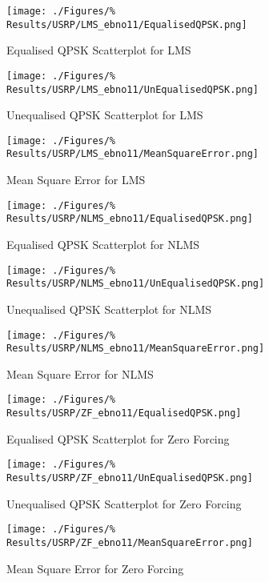 \begin{figure}[ht]
	\centering
	\begin{minipage}{0.49\textwidth}
		\centering
		\texttt{[image: ./Figures/\%
		Results/USRP/LMS\_ebno11/EqualisedQPSK.png]}
		\captionsetup{width=0.75\linewidth}
		\caption{Equalised QPSK Scatterplot for LMS}
	\end{minipage}
	\begin{minipage}{0.49\textwidth}
		\centering
		\texttt{[image: ./Figures/\%
		Results/USRP/LMS\_ebno11/UnEqualisedQPSK.png]}
		\captionsetup{width=0.75\linewidth}
		\caption{Unequalised QPSK Scatterplot for LMS}
	\end{minipage}
\end{figure}
\begin{figure}[ht]
	\centering
	\texttt{[image: ./Figures/\%
	Results/USRP/LMS\_ebno11/MeanSquareError.png]}
	\captionsetup{width=0.75\linewidth}
	\caption{Mean Square Error for LMS}
\end{figure}

\begin{figure}[ht]
	\centering
	\begin{minipage}{0.49\textwidth}
		\centering
		\texttt{[image: ./Figures/\%
		Results/USRP/NLMS\_ebno11/EqualisedQPSK.png]}
		\captionsetup{width=0.75\linewidth}
		\caption{Equalised QPSK Scatterplot for NLMS}
	\end{minipage}
	\begin{minipage}{0.49\textwidth}
		\centering
		\texttt{[image: ./Figures/\%
		Results/USRP/NLMS\_ebno11/UnEqualisedQPSK.png]}
		\captionsetup{width=0.75\linewidth}
		\caption{Unequalised QPSK Scatterplot for NLMS}
	\end{minipage}
\end{figure}
\begin{figure}[ht]
	\centering
	\texttt{[image: ./Figures/\%
	Results/USRP/NLMS\_ebno11/MeanSquareError.png]}
	\captionsetup{width=0.75\linewidth}
	\caption{Mean Square Error for NLMS}
\end{figure}

\begin{figure}[ht]
	\centering
	\begin{minipage}{0.49\textwidth}
		\centering
		\texttt{[image: ./Figures/\%
		Results/USRP/ZF\_ebno11/EqualisedQPSK.png]}
		\captionsetup{width=0.75\linewidth}
		\caption{Equalised QPSK Scatterplot for Zero 
		Forcing}
	\end{minipage}
	\begin{minipage}{0.49\textwidth}
		\centering
		\texttt{[image: ./Figures/\%
		Results/USRP/ZF\_ebno11/UnEqualisedQPSK.png]}
		\captionsetup{width=0.75\linewidth}
		\caption{Unequalised QPSK Scatterplot for Zero 
		Forcing}
	\end{minipage}
\end{figure}
\begin{figure}[ht]
	\centering
	\texttt{[image: ./Figures/\%
	Results/USRP/ZF\_ebno11/MeanSquareError.png]}
	\captionsetup{width=0.75\linewidth}
	\caption{Mean Square Error for Zero Forcing}
\end{figure}

